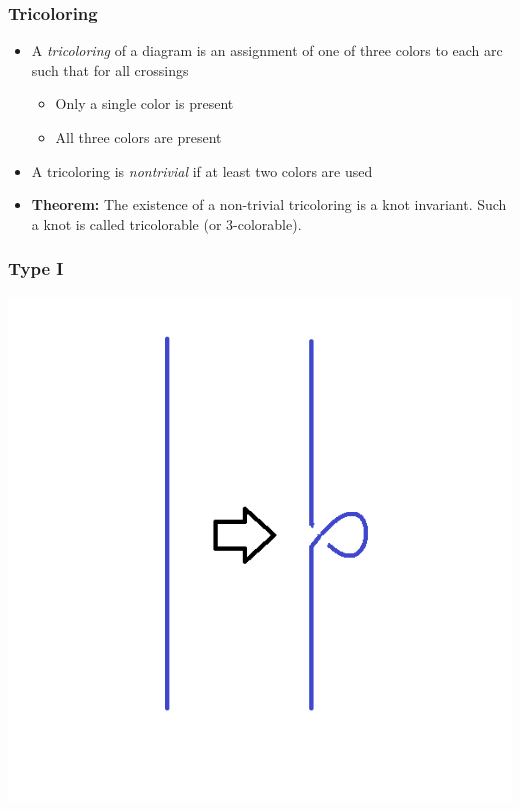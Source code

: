 \documentclass{beamer}
\begin{document}
\begin{frame}
  \frametitle{Tricoloring}
  \begin{itemize}
  \item A \textit{tricoloring} of a diagram is an assignment
    of one of three colors to each arc such that for all crossings
    \begin{itemize}
    \item Only a single color is present
    \item All three colors are present
    \end{itemize}
  \item A tricoloring is \textit{nontrivial} if at least two colors are used
  \item \textbf{Theorem:} The existence of a non-trivial tricoloring is a knot
    invariant. Such a knot is called tricolorable (or $3$-colorable).
  \end{itemize}
\end{frame}

\begin{frame}
  \frametitle{Type I}
  \begin{center}
    \includegraphics[scale=.4]{t1-c}
  \end{center}
\end{frame}
\end{document}
